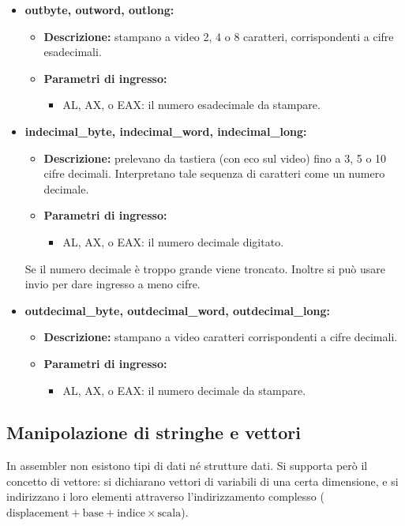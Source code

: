\documentclass[a4paper,11pt]{article}
\begin{document}
\begin{itemize}
	\item \textbf{outbyte, outword, outlong:}
		\begin{itemize}
		\item \textbf{Descrizione:} stampano a video 2, 4 o 8 caratteri, corrispondenti a cifre esadecimali.
		\item \textbf{Parametri di ingresso:} 
			\begin{itemize}
				\item AL, AX, o EAX: il numero esadecimale da stampare.
			\end{itemize}
		\end{itemize}


	\item \textbf{indecimal\_byte, indecimal\_word, indecimal\_long:}
		\begin{itemize}
		\item \textbf{Descrizione:} prelevano da tastiera (con eco sul video) fino a 3, 5 o 10 cifre decimali.
			Interpretano tale sequenza di caratteri come un numero decimale.
		\item \textbf{Parametri di ingresso:} 
			\begin{itemize}
				\item AL, AX, o EAX: il numero decimale digitato.
			\end{itemize}
		\end{itemize}
	Se il numero decimale è troppo grande viene troncato.
	Inoltre si può usare invio per dare ingresso a meno cifre.

	
	\item \textbf{outdecimal\_byte, outdecimal\_word, outdecimal\_long:}
		\begin{itemize}
		\item \textbf{Descrizione:} stampano a video caratteri corrispondenti a cifre decimali.
		\item \textbf{Parametri di ingresso:} 
			\begin{itemize}
				\item AL, AX, o EAX: il numero decimale da stampare.
			\end{itemize}
		\end{itemize}

\end{itemize}

\subsection{Manipolazione di stringhe e vettori}
In assembler non esistono tipi di dati né strutture dati.
Si supporta però il concetto di vettore: si dichiarano vettori di variabili di una certa dimensione, e si indirizzano i loro elementi attraverso l'indirizzamento complesso ($\text{displacement} + \text{base} + \text{indice} \times \text{scala}$).
\end{document}
